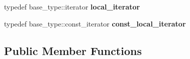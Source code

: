 \begin{DoxyCompactItemize}
\item 
\hypertarget{classtbb_1_1interface5_1_1concurrent__unordered__map_a744c0cf93efb5a134d6ddfb3a5fb75d3}{}typedef base\+\_\+type\+::iterator {\bfseries local\+\_\+iterator}\label{classtbb_1_1interface5_1_1concurrent__unordered__map_a744c0cf93efb5a134d6ddfb3a5fb75d3}

\item 
\hypertarget{classtbb_1_1interface5_1_1concurrent__unordered__map_a5df36261f0e5a1aea64235702fdacb62}{}typedef base\+\_\+type\+::const\+\_\+iterator {\bfseries const\+\_\+local\+\_\+iterator}\label{classtbb_1_1interface5_1_1concurrent__unordered__map_a5df36261f0e5a1aea64235702fdacb62}

\end{DoxyCompactItemize}
\subsection*{Public Member Functions}
